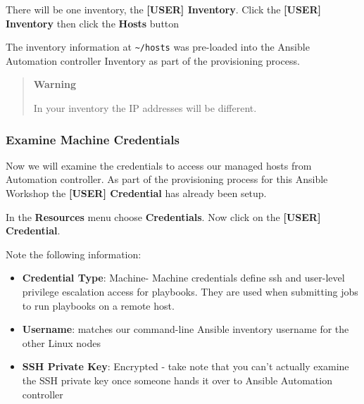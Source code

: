 There will be one inventory, the \textbf{[USER] Inventory}. Click the
\textbf{[USER] Inventory} then click the \textbf{Hosts} button

The inventory information at
\texttt{\textasciitilde{}/hosts} was pre-loaded into the
Ansible Automation controller Inventory as part of the provisioning
process.

\begin{Shaded}
\begin{Highlighting}[]
\ExtensionTok{$}
\ExtensionTok{[web]}

\ExtensionTok{[control]}
\end{Highlighting}
\end{Shaded}

\begin{quote}
\textbf{Warning}

In your inventory the IP addresses will be different.
\end{quote}

\hypertarget{examine-machine-credentials}{%
\subsubsection{Examine Machine
Credentials}\label{examine-machine-credentials}}

Now we will examine the credentials to access our managed hosts from
Automation controller. As part of the provisioning process for this
Ansible Workshop the \textbf{[USER] Credential} has already been
setup.

In the \textbf{Resources} menu choose \textbf{Credentials}. Now click on
the \textbf{[USER] Credential}.

Note the following information:
\begin{itemize}
        \tightlist
    \item \textbf{Credential Type}: Machine- Machine credentials define ssh and user-level privilege
escalation access for playbooks. They are used when submitting jobs to
run playbooks on a remote host.
\item \textbf{Username}: matches our command-line Ansible inventory username for
the other Linux nodes
\item \textbf{SSH Private Key}: Encrypted - take note that you can't actually examine the SSH private
key once someone hands it over to Ansible Automation controller
\end{itemize}

